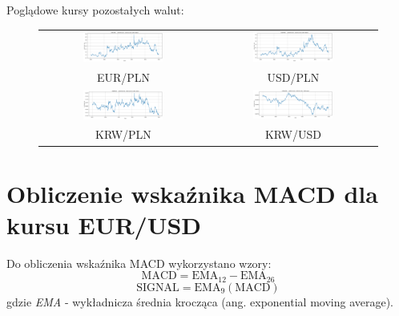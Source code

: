\documentclass[12pt, a4paper]{article}
\begin{document}
\begin{center}
    Poglądowe kursy pozostałych walut:
\end{center}
\begin{figure}[ht]
    \hspace{-1cm}
    \begin{tabular}{cc}
        \includegraphics[width=0.5\textwidth]{eur_pln_value.png} &
        \includegraphics[width=0.5\textwidth]{usd_pln_value.png}           \\
        EUR/PLN                                                  & USD/PLN \\
        \includegraphics[width=0.5\textwidth]{krw_pln_value.png} &
        \includegraphics[width=0.5\textwidth]{krw_usd_value.png}           \\
        KRW/PLN                                                  & KRW/USD \\
    \end{tabular}
    \label{fig:other_currencies}
\end{figure}

\section{Obliczenie wskaźnika MACD dla kursu EUR/USD}

Do obliczenia wskaźnika MACD wykorzystano wzory:
\begin{equation}
    \text{MACD} = \text{EMA}_{12} - \text{EMA}_{26}
\end{equation}
\begin{equation}
    \text{SIGNAL} = \text{EMA}_{9}(\text{MACD})
\end{equation}
gdzie \textit{EMA} - wykładnicza średnia krocząca (ang. exponential moving average).
\end{document}
